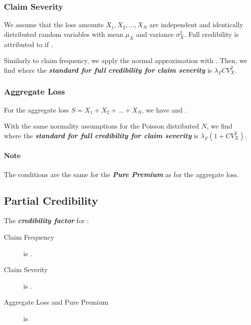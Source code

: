 \documentclass[english]{article}
\begin{document}
\begin{multicols*}{2}
\subsubsection{Claim Severity}
We assume that the loss amounts $X_{1}, X_{2}, \dots, X_{N}$ are independent and identically distributed random variables with mean $\mu_{X}$ and variance $\sigma^{2}_{X}$. Full credibility is attributed to  if . 

\bigskip

Similarly to claim frequency, we apply the normal approximation with . Then, we find  where the \textbf{\textit{standard for full credibility for claim severity}} is $\lambda_{F}CV_{X}^{2}$.


\subsubsection{Aggregate Loss}
For the aggregate loss $S = X_{1} + X_{2} + \hdots + X_{N}$, we have  and .

\bigskip

With the same normality assumptions for the Poisson distributed $N$, we find  where the \textbf{\textit{standard for full credibility for claim severity}} is $\lambda_{F}(1 + CV_{X}^{2})$.

\paragraph{Note}	The conditions are the same for the \textit{\textbf{Pure Premium}} as for the aggregate loss.


\subsection{Partial Credibility}\label{subsec:PartialCred}
The \textbf{\textit{credibility factor}} for :
\begin{description}
	\item[Claim Frequency]	is .
	\item[Claim Severity]	is .
	\item[Aggregate Loss and Pure Premium]	is 
\end{description}



\end{multicols*}
\end{document}
